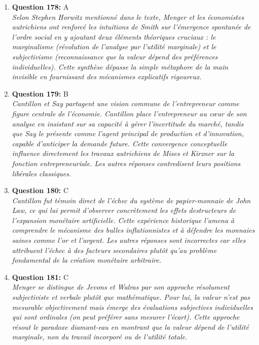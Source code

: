 \documentclass[12pt,a4paper]{article}
\begin{document}
\begin{enumerate}
\item \textbf{Question 178:} A
\\ \textit{Selon Stephen Horwitz mentionné dans le texte, Menger et les économistes autrichiens ont renforcé les intuitions de Smith sur l'émergence spontanée de l'ordre social en y ajoutant deux éléments théoriques cruciaux : le marginalisme (révolution de l'analyse par l'utilité marginale) et le subjectivisme (reconnaissance que la valeur dépend des préférences individuelles). Cette synthèse dépasse la simple métaphore de la main invisible en fournissant des mécanismes explicatifs rigoureux.}

\item \textbf{Question 179:} B
\\ \textit{Cantillon et Say partagent une vision commune de l'entrepreneur comme figure centrale de l'économie. Cantillon place l'entrepreneur au cœur de son analyse en insistant sur sa capacité à gérer l'incertitude du marché, tandis que Say le présente comme l'agent principal de production et d'innovation, capable d'anticiper la demande future. Cette convergence conceptuelle influence directement les travaux autrichiens de Mises et Kirzner sur la fonction entrepreneuriale. Les autres réponses contredisent leurs positions libérales classiques.}

\item \textbf{Question 180:} C
\\ \textit{Cantillon fut témoin direct de l'échec du système de papier-monnaie de John Law, ce qui lui permit d'observer concrètement les effets destructeurs de l'expansion monétaire artificielle. Cette expérience historique l'amena à comprendre le mécanisme des bulles inflationnistes et à défendre les monnaies saines comme l'or et l'argent. Les autres réponses sont incorrectes car elles attribuent l'échec à des facteurs secondaires plutôt qu'au problème fondamental de la création monétaire arbitraire.}

\item \textbf{Question 181:} C
\\ \textit{Menger se distingue de Jevons et Walras par son approche résolument subjectiviste et verbale plutôt que mathématique. Pour lui, la valeur n'est pas mesurable objectivement mais émerge des évaluations subjectives individuelles qui sont ordinales (on peut préférer sans mesurer l'écart). Cette approche résout le paradoxe diamant-eau en montrant que la valeur dépend de l'utilité marginale, non du travail incorporé ou de l'utilité totale.}


\end{enumerate}
\end{document}
